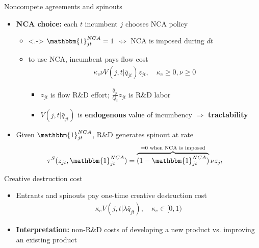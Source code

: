 \documentclass[english,usenames,dvipsnames]{beamer}
\begin{document}
\begin{frame}{Noncompete agreements and spinouts}
	\begin{itemize}
		\item<+-> \alert{\textbf{NCA choice:}} each $t$ incumbent $j$ chooses NCA policy
		\begin{itemize}
			\item<.-> $\mathbbm{1}^{NCA}_{jt} = 1$ $\Leftrightarrow$ NCA is imposed during $dt$
			\item<+-> to use NCA, incumbent pays flow cost 
			\begin{align*}
				 \kappa_c \nu V(j,t | \bar{q}_{jt}) z_{jt}, \quad \kappa_c \ge 0, \nu \ge 0
			\end{align*}
			\vspace{-17pt} 
			\begin{itemize}
				\item<+-> $z_{jt}$ is flow R\&D effort; $\frac{\bar{q}_{jt}}{Q_t} z_{jt}$ is R\&D labor
				\item<+-> $V(j,t|\bar{q}_{jt})$ is \alert{\textbf{endogenous}} value of incumbency $\Rightarrow$ \alert{\textbf{tractability}} 
			\end{itemize}
		\end{itemize}
		\bigskip
		\item<+-> Given $\mathbbm{1}^{NCA}_{jt}$, R\&D generates spinout at rate
		\begin{align*}
		\tau^S(z_{jt},\mathbbm{1}^{NCA}_{jt}) &= \overbrace{(1-\mathbbm{1}_{jt}^{NCA})}^{\mathclap{= 0 \text{ when NCA is imposed}}} \nu z_{jt}
		\end{align*}
	\end{itemize}
\end{frame}

\begin{frame}{Creative destruction cost}
	\begin{itemize}
		\item Entrants and spinouts pay one-time creative destruction cost
		\begin{align*}
			\kappa_e V(j,t|\lambda \bar{q}_{jt}), \quad \kappa_e \in [0,1)
		\end{align*}
		\smallskip
		\item \alert{\textbf{Interpretation:}} non-R\&D costs of developing a new product vs. improving an existing product
	\end{itemize}
\end{frame}
\end{document}
